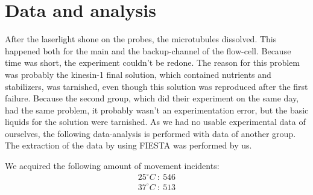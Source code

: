 \documentclass[english, %
parskip=full, %
bibliography=totoc, %
]{scrartcl}
\begin{document}
\section{Data and analysis}

After the laserlight shone on the probes, the microtubules dissolved. This happened both for the main and the backup-channel of the flow-cell. Because time was short, the experiment couldn't be redone.
The reason for this problem was probably the kinesin-1 final solution, which contained nutrients and stabilizers, was tarnished, even though this solution was reproduced after the first failure. Because the second group, which did their experiment on the same day, had the same problem, it probably wasn't an experimentation error, but the basic liquids for the solution were tarnished. 
As we had no usable experimental data of ourselves, the following data-analysis is performed with data of another group. The extraction of the data by using FIESTA was performed by us. 

We acquired the following amount of movement incidents: 
\begin{align*}
25^\circ C \ : \ 546 \\
37^\circ C \ : \ 513
\end{align*}
\end{document}
